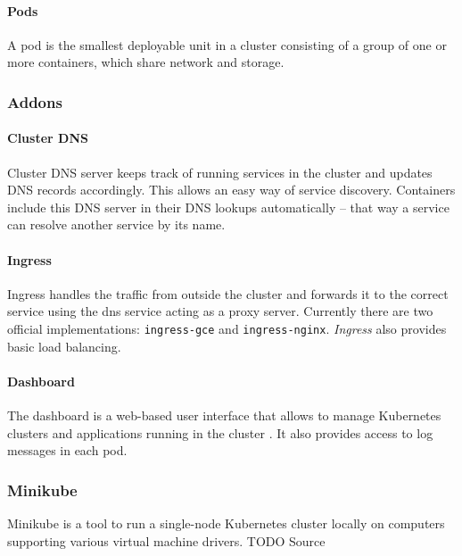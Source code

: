 \paragraph{Pods}\label{pods}

A pod is the smallest deployable unit in a cluster consisting of a group
of one or more containers, which share network and storage.
\cite{kub-pod}

\subsubsection{Addons}\label{addons}

\paragraph{Cluster DNS}\label{cluster-dns}

Cluster DNS server keeps track of running services in the cluster and
updates DNS records accordingly. This allows an easy way of service
discovery. Containers include this DNS server in their DNS lookups
automatically -- that way a service can resolve another service by its
name. \cite{baier-kub}

\paragraph{Ingress}\label{ingress}

Ingress handles the traffic from outside the cluster and forwards it to
the correct service using the dns service acting as a proxy server.
Currently there are two official implementations: \texttt{ingress-gce}
and \texttt{ingress-nginx}. \emph{Ingress} also provides basic load
balancing. \cite{kub-ingress}

\paragraph{Dashboard}\label{dashboard}

The dashboard is a web-based user interface that allows to manage
Kubernetes clusters and applications running in the cluster
\cite{kub_comp}. It also provides access to log messages in each pod.

\subsubsection{Minikube}\label{minikube}

Minikube is a tool to run a single-node Kubernetes cluster locally on
computers supporting various virtual machine drivers. TODO Source

